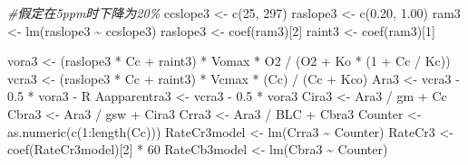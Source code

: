 \documentclass[
]{krantz}
\makeatletter
\newenvironment{Shaded}{\begin{snugshade}}{\end{snugshade}}
\newcommand{\CommentTok}[1]{\textcolor[rgb]{0.56,0.35,0.01}{\textit{#1}}}
\newcommand{\DecValTok}[1]{\textcolor[rgb]{0.00,0.00,0.81}{#1}}
\newcommand{\FloatTok}[1]{\textcolor[rgb]{0.00,0.00,0.81}{#1}}
\newcommand{\FunctionTok}[1]{\textcolor[rgb]{0.00,0.00,0.00}{#1}}
\newcommand{\NormalTok}[1]{#1}
\newcommand{\OtherTok}[1]{\textcolor[rgb]{0.56,0.35,0.01}{#1}}
\newcommand{\SpecialCharTok}[1]{\textcolor[rgb]{0.00,0.00,0.00}{#1}}
\newenvironment{kframe}{%
\medskip{}
\setlength{\fboxsep}{.8em}
 \def\at@end@of@kframe{}%
 \ifinner\ifhmode%
  \def\at@end@of@kframe{\end{minipage}}%
  \begin{minipage}{\columnwidth}%
 \fi\fi%
 \def\FrameCommand##1{\hskip\@totalleftmargin \hskip-\fboxsep
 \colorbox{shadecolor}{##1}\hskip-\fboxsep
     \hskip-\linewidth \hskip-\@totalleftmargin \hskip\columnwidth}%
 \MakeFramed {\advance\hsize-\width
   \@totalleftmargin\z@ \linewidth\hsize
   \@setminipage}}%
 {\par\unskip\endMakeFramed%
 \at@end@of@kframe}
\renewenvironment{Shaded}{\begin{kframe}}{\end{kframe}}
\makeatother
\begin{document}
\begin{Shaded}
\begin{Highlighting}[]
\CommentTok{\#假定在5ppm时下降为20\%}
\NormalTok{ccslope3 }\OtherTok{\textless{}{-}} \FunctionTok{c}\NormalTok{(}\DecValTok{25}\NormalTok{, }\DecValTok{297}\NormalTok{)}
\NormalTok{raslope3 }\OtherTok{\textless{}{-}} \FunctionTok{c}\NormalTok{(}\FloatTok{0.20}\NormalTok{, }\FloatTok{1.00}\NormalTok{)}
\NormalTok{ram3 }\OtherTok{\textless{}{-}} \FunctionTok{lm}\NormalTok{(raslope3 }\SpecialCharTok{\textasciitilde{}}\NormalTok{ ccslope3)}
\NormalTok{raslope3 }\OtherTok{\textless{}{-}} \FunctionTok{coef}\NormalTok{(ram3)[}\DecValTok{2}\NormalTok{]}
\NormalTok{raint3 }\OtherTok{\textless{}{-}} \FunctionTok{coef}\NormalTok{(ram3)[}\DecValTok{1}\NormalTok{]}

\NormalTok{vora3 }\OtherTok{\textless{}{-}}
\NormalTok{  (raslope3 }\SpecialCharTok{*}\NormalTok{ Cc }\SpecialCharTok{+}\NormalTok{ raint3) }\SpecialCharTok{*}\NormalTok{ Vomax }\SpecialCharTok{*}\NormalTok{ O2 }\SpecialCharTok{/}\NormalTok{ (O2 }\SpecialCharTok{+}\NormalTok{ Ko }\SpecialCharTok{*}\NormalTok{ (}\DecValTok{1} \SpecialCharTok{+}\NormalTok{ Cc }\SpecialCharTok{/}\NormalTok{ Kc)) }
\NormalTok{vcra3 }\OtherTok{\textless{}{-}}\NormalTok{ (raslope3 }\SpecialCharTok{*}\NormalTok{ Cc }\SpecialCharTok{+}\NormalTok{ raint3) }\SpecialCharTok{*}\NormalTok{ Vcmax }\SpecialCharTok{*}\NormalTok{ (Cc) }\SpecialCharTok{/}\NormalTok{ (Cc }\SpecialCharTok{+}\NormalTok{ Kco) }
\NormalTok{Ara3 }\OtherTok{\textless{}{-}}\NormalTok{ vcra3 }\SpecialCharTok{{-}} \FloatTok{0.5} \SpecialCharTok{*}\NormalTok{ vora3 }\SpecialCharTok{{-}}\NormalTok{ R }
\NormalTok{Aapparentra3 }\OtherTok{\textless{}{-}}\NormalTok{ vcra3 }\SpecialCharTok{{-}} \FloatTok{0.5} \SpecialCharTok{*}\NormalTok{ vora3 }
\NormalTok{Cira3 }\OtherTok{\textless{}{-}}\NormalTok{ Ara3 }\SpecialCharTok{/}\NormalTok{ gm }\SpecialCharTok{+}\NormalTok{ Cc }
\NormalTok{Cbra3 }\OtherTok{\textless{}{-}}\NormalTok{ Ara3 }\SpecialCharTok{/}\NormalTok{ gsw }\SpecialCharTok{+}\NormalTok{ Cira3 }
\NormalTok{Crra3 }\OtherTok{\textless{}{-}}\NormalTok{ Ara3 }\SpecialCharTok{/}\NormalTok{ BLC }\SpecialCharTok{+}\NormalTok{ Cbra3 }
\NormalTok{Counter }\OtherTok{\textless{}{-}} \FunctionTok{as.numeric}\NormalTok{(}\FunctionTok{c}\NormalTok{(}\DecValTok{1}\SpecialCharTok{:}\FunctionTok{length}\NormalTok{(Cc)))}
\NormalTok{RateCr3model }\OtherTok{\textless{}{-}} \FunctionTok{lm}\NormalTok{(Crra3 }\SpecialCharTok{\textasciitilde{}}\NormalTok{ Counter)}
\NormalTok{RateCr3 }\OtherTok{\textless{}{-}} \FunctionTok{coef}\NormalTok{(RateCr3model)[}\DecValTok{2}\NormalTok{] }\SpecialCharTok{*} \DecValTok{60} 
\NormalTok{RateCb3model }\OtherTok{\textless{}{-}} \FunctionTok{lm}\NormalTok{(Cbra3 }\SpecialCharTok{\textasciitilde{}}\NormalTok{ Counter)}

\end{Highlighting}
\end{Shaded}
\end{document}
